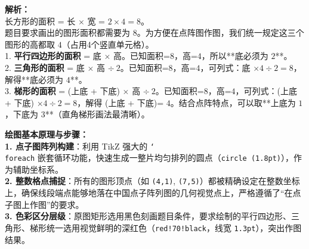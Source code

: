 \begin{center}
\end{center}

\vspace{0.8cm}

{\small\color{gray}
\textbf{解析：}\\
长方形的面积 = 长 $\times$ 宽 = $2 \times 4 = 8$。\\
题目要求画出的图形面积都需要为 $8$。为方便在点阵图作图，我们统一规定这三个图形的高都取 $4$（占用4个竖直单元格）。\\
1. \textbf{平行四边形的面积} = 底 $\times$ 高。已知面积=$8$，高=$4$，所以**底必须为 $2$**。\\
2. \textbf{三角形的面积} = 底 $\times$ 高 $\div\ 2$。已知面积=$8$，高=$4$，可列式：底 $\times 4 \div 2 = 8$，解得**底必须为 $4$**。\\
3. \textbf{梯形的面积} = (上底 + 下底) $\times$ 高 $\div\ 2$。已知面积=$8$，高=$4$，可列式：(上底 + 下底) $\times 4 \div 2 = 8$，解得 (上底 + 下底)= $4$。结合点阵特点，可以取**上底为 $1$，下底为 $3$**（直角梯形画法最清晰）。
}

\vspace{0.6cm}

{\small\color{blue!70!black}
\textbf{绘图基本原理与步骤：}\\
\textbf{1. 点子图阵列构建}：利用 TikZ 强大的 \texttt{\char`\\foreach} 嵌套循环功能，快速生成一整片均匀排列的圆点（\texttt{circle (1.8pt)}），作为辅助坐标系。\\
\textbf{2. 整数格点捕捉}：所有的图形顶点（如 \texttt{(4,1)}, \texttt{(7,5)}）都被精确设定在整数坐标上，确保线段端点能够地落在中国点子阵列图的几何视觉点上，严格遵循了“在点子图上作图”的要求。\\
\textbf{3. 色彩区分层级}：原图矩形选用黑色刻画题目条件，要求绘制的平行四边形、三角形、梯形统一选用视觉鲜明的深红色（\texttt{red!70!black}，线宽 \texttt{1.3pt}），突出作图结果。
}

